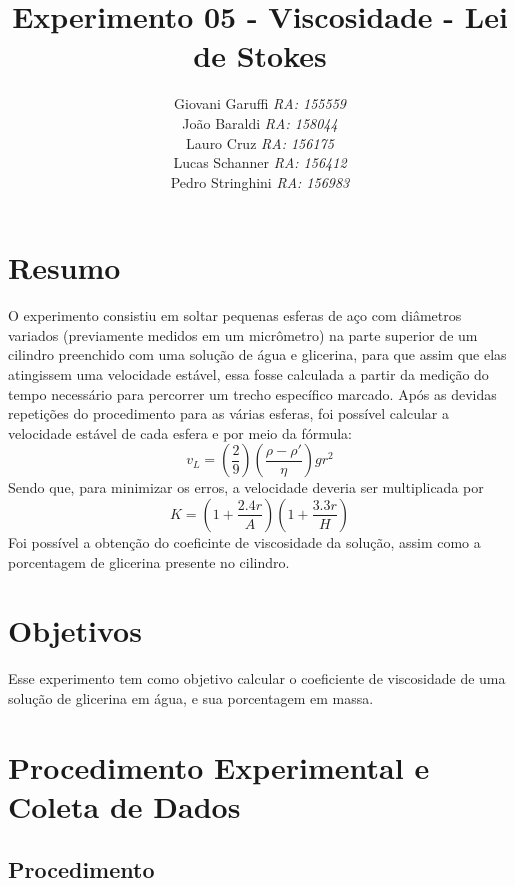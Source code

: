 \documentclass[12pt,a4paper]{article}
\begin{document}
\title{\vspace{70mm}\Huge Experimento 05 - Viscosidade - Lei de Stokes}
\author{ Giovani Garuffi\qquad\hfill
		\textit {RA: 155559}\protect\\
		João Baraldi\hfill
		\textit{RA: 158044}\protect\\
		Lauro Cruz\hfill
		\textit{RA: 156175}\protect\\
		Lucas Schanner\hfill
		\textit{RA: 156412}\protect\\
		Pedro Stringhini\hfill
		\textit {RA: 156983}								
		}
\maketitle
\newpage
\section{Resumo}
O experimento consistiu em soltar pequenas esferas de aço com diâmetros variados (previamente medidos em um micrômetro) na parte superior de um cilindro preenchido com uma solução de água e glicerina, para que assim que elas atingissem uma velocidade estável, essa fosse calculada a partir da medição do tempo necessário para percorrer um trecho específico marcado.
Após as devidas repetições do procedimento para as várias esferas, foi possível calcular a velocidade estável de cada esfera e por meio da fórmula:
$$v_L = (\frac{2}{9}) (\frac{\rho - \rho'}{\eta}) g r^2$$
Sendo que, para minimizar os erros, a velocidade deveria ser multiplicada por
$$K = (1 + \frac{2.4r}{A})(1 + \frac{3.3r}{H})$$
Foi possível a obtenção do coeficinte de viscosidade da solução, assim como a porcentagem de glicerina presente no cilindro.

\section{Objetivos}
Esse experimento tem como objetivo calcular o coeficiente de viscosidade de uma solução de glicerina em água, e sua porcentagem em massa.


\section{Procedimento Experimental e Coleta de Dados}


\subsection{Procedimento}
\end{document}

